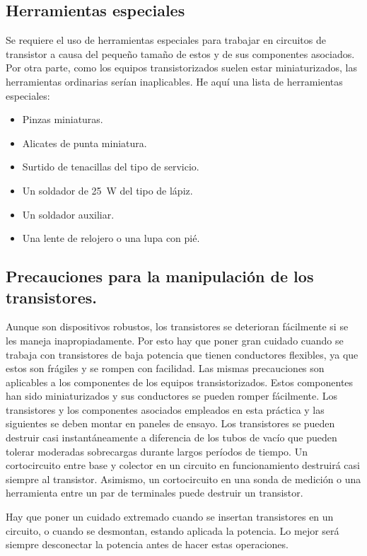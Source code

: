 \documentclass[a4paper,12pt]{article}
\begin{document}
\subsection{Herramientas especiales}
Se requiere el uso de herramientas especiales para trabajar en circuitos
de transistor a causa del pequeño tamaño de estos y de sus componentes
asociados. Por otra parte, como los equipos transistorizados suelen estar
miniaturizados, las herramientas ordinarias serían inaplicables. He aquí una
lista de herramientas especiales:
\begin{itemize}
    \item Pinzas miniaturas.
    \item Alicates de punta miniatura.
    \item Surtido de tenacillas del tipo de servicio.
    \item Un soldador de \SI{25}{\watt} del tipo de lápiz.
    \item Un soldador auxiliar.
    \item Una lente de relojero o una lupa con pié.
\end{itemize}

\subsection{Precauciones para la manipulación de los transistores.}
Aunque son dispositivos robustos, los transistores se deterioran
fácilmente si se les maneja inapropiadamente. Por esto hay que poner gran
cuidado cuando se trabaja con transistores de baja potencia que tienen
conductores flexibles, ya que estos son frágiles y se rompen con facilidad.
Las mismas precauciones son aplicables a los componentes de los equipos
transistorizados. Estos componentes han sido miniaturizados y sus conductores
se pueden romper fácilmente. Los transistores y los componentes asociados
empleados en esta práctica y las siguientes se deben montar en paneles de
ensayo. Los transistores se pueden destruir casi instantáneamente a diferencia
de los tubos de vacío que pueden tolerar moderadas sobrecargas durante
largos períodos de tiempo. Un cortocircuito entre base y colector en un
circuito en funcionamiento destruirá casi siempre al transistor. Asimismo,
un cortocircuito en una sonda de medición o una herramienta entre un par
de terminales puede destruir un transistor.

Hay que poner un cuidado extremado cuando se insertan transistores en un
circuito, o cuando se desmontan, estando aplicada la potencia. Lo mejor
será siempre desconectar la potencia antes de hacer estas operaciones.
\end{document}
